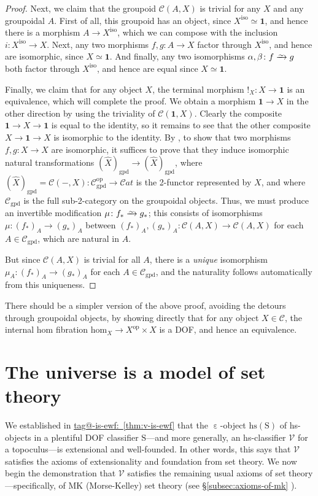 \documentclass{amsart}
\makeatletter
\newcommand\Cat{\mathcal{C}at}
\newcommand\cC{\mathcal{C}}
\newcommand\cV{\mathcal{V}}
\newcommand\ein{\mathrel{\varepsilon}}
\newcommand\gpd{\mathrm{gpd}}
\newcommand\hs{\mathrm{hs}}
\newcommand\iso{\mathrm{iso}}
\newcommand\op{\mathrm{op}}
\newcommand\rS{\mathrm{S}}
\newcommand\tm{\mathbf{1}}
\newcommand\toi{\xrightarrow{\raisebox{-2.5pt}[0pt][0pt]{\ensuremath{\scriptstyle{\sim}}}}}
\newcommand\unein{{\ein}}
\newcommand\unex{{!}}
\newcommand\wh[1]{\widehat{#1}}
\newcommand\tagword[1]{\csname tag@#1\endcsname}
\def\label@tag#1:#2\@nil{#1}
\newcommand\labeltag[1]{\label@tag#1:\@nil}
\newcommand\jref[1]{%
  \texorpdfstring%
    {\hyperref[#1]{\tagword{\labeltag{#1}}~\ref*{#1}}}%
    {\tagword{\labeltag{#1}}~\ref*{#1}}%
}
\newcommand\prerefpost[3]{%
  \texorpdfstring%
    {\hyperref[#2]{#1\ref*{#2}#3}}%
    {#1\ref*{#2}#3}%
}
\newcommand\sref[1]{\prerefpost{\S}{#1}{}}
\theoremstyle{definition}
\theoremstyle{remark}
\theoremstyle{plainwithref}
\makeatother
\begin{document}
\begin{proof}
  Next, we claim that the groupoid \( \cC(A, X) \) is trivial for any \( X \) and any groupoidal \( A \).
  First of all, this groupoid has an object, since \( X^\iso \simeq \tm \), and hence there is a morphism \( A \to X^\iso \), which we can compose with the inclusion \( i \colon X^\iso \to X \).
  Next, any two morphisms \( f,g \colon A \to X \) factor through \( X^\iso \), and hence are isomorphic, since \( X \simeq \tm \).
  And finally, any two isomorphisms \( \alpha,\beta \colon f \toi g \) both factor through \( X^\iso \), and hence are equal since \( X \simeq \tm \).

  Finally, we claim that for any object \( X \), the terminal morphism \( \unex_X \colon X \to \tm \) is an equivalence, which will complete the proof.
  We obtain a morphism \( \tm \to X \) in the other direction by using the triviality of \( \cC(\tm, X) \).
  Clearly the composite \( \tm \to X \to \tm \) is equal to the identity, so it remains to see that the other composite \( X \to \tm \to X \) is isomorphic to the identity.
  By \cite[Corollary~6.2.3]{helfer-topoi-in-topoi}, to show that two morphisms \( f,g \colon X \to X \) are isomorphic, it suffices to prove that they induce isomorphic natural transformations \( (\wh X)_\gpd \to (\wh X)_\gpd \), where \( (\wh X)_\gpd = \cC(-, X) \colon \cC_\gpd^\op \to \Cat \) is the 2-functor represented by \( X \), and where \( \cC_\gpd \) is the full sub-2-category on the groupoidal objects.
  Thus, we must produce an invertible modification \( \mu \colon f_* \toi g_* \); this consists of isomorphisms \( \mu \colon (f_*)_A \to (g_*)_A \) between \( (f_*)_A, (g_*)_A \colon \cC(A,X) \to \cC(A,X) \) for each \( A \in \cC_\gpd \), which are natural in \( A \).

  But since \( \cC(A,X) \) is trivial for all \( A \), there is a \emph{unique} isomorphism \( \mu_A \colon (f_*)_A \to (g_*)_A \) for each \( A \in \cC_\gpd \), and the naturality follows automatically from this uniqueness.
\end{proof}

\begin{rmk}
  There should be a simpler version of the above proof, avoiding the detours through groupoidal objects, by showing directly that for any object \( X \in \cC \), the internal hom fibration \( \mathrm{hom}_X \to X^\op \times X \) is a DOF, and hence an equivalence.
\end{rmk}

\section{The universe is  a model of set theory} \label{sec:v-is-a-model}
We established in \jref{thm:v-is-ewf} that the \( \unein \)-object \( \hs(\rS) \) of hs-objects in a plentiful DOF classifier \( \rS \)---and more generally, an hs-classifier \( \cV \) for a topoculus---is extensional and well-founded.
In other words, this says that \( \cV \) satisfies the axioms of extensionality and foundation from set theory.
We now begin the demonstration that \( \cV \) satisfies the remaining usual axioms of set theory---specifically, of MK (Morse-Kelley) set theory (see \sref{subsec:axioms-of-mk}).
\end{document}
